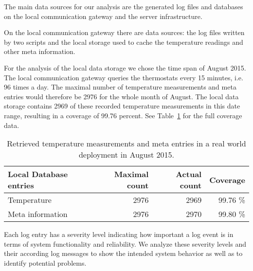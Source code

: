 The main data sources for our analysis are the generated log files and databases on the local communication gateway and the server infrastructure.

On the local communication gateway there are data sources: the log files written by two scripts and the local storage used to cache the temperature readings and other meta information.



For the analysis of the local data storage we chose the time span of August 2015.
The local communication gateway queries the thermostats every 15 minutes, i.e. 96 times a day.
The maximal number of temperature measurements and meta entries would therefore be 2976 for the whole month of August.
The local data storage contains 2969 of these recorded temperature measurements in this date range, resulting in a coverage of 99.76 percent.
See Table~\ref{table:evaluation_local_database_coverage} for the full coverage data.

\begin{table}
	\begin{center}
		\begin{tabular}{ l | r r r }
			Local Database entries & Maximal count & Actual count & Coverage \\
			\hline
			Temperature					& 2976 & 2969 & 99.76 \% \\
			Meta information			& 2976 & 2970 & 99.80 \% \\
		\end{tabular}
		\caption{Retrieved temperature measurements and meta entries in a real world deployment in August 2015.}
		\label{table:evaluation_local_database_coverage}
	\end{center}
\end{table}


Each log entry has a severity level indicating how important a log event is in terms of system functionality and reliability.
We analyze these severity levels and their according log messages to show the intended system behavior as well as to identify potential problems.



